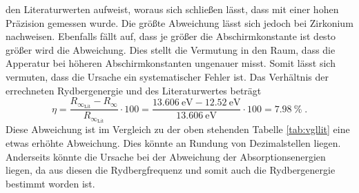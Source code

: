 den Literaturwerten aufweist, woraus sich schließen lässt, dass mit einer hohen Präzision gemessen wurde.
Die größte Abweichung lässt sich jedoch bei Zirkonium nachweisen. 
Ebenfalls fällt auf, dass je größer die Abschirmkonstante ist desto größer wird die Abweichung.
Dies stellt die Vermutung in den Raum, dass die Apperatur bei höheren Abschirmkonstanten ungenauer misst.
Somit lässt sich vermuten, dass die Ursache ein systematischer Fehler ist.
Das Verhältnis der errechneten Rydbergenergie und des Literaturwertes beträgt
\begin{equation}
    \eta = \frac{R_{\infty_\text{Lit}}-R_\infty}{R_{\infty_\text{Lit}}} \cdot 100= \frac{\SI{13.606}{\electronvolt} - \SI{12.52}{\electronvolt}}{\SI{13.606}{\electronvolt}} \cdot 100 = \SI{7.98}{\percent} \; \text{.}
\end{equation}
Diese Abweichung ist im Vergleich zu der oben stehenden Tabelle \ref{tab:vgllit} eine etwas erhöhte Abweichung.
Dies könnte an Rundung von Dezimalstellen liegen. Anderseits könnte die Ursache bei der Abweichung der Absorptionsenergien liegen, da aus diesen die Rydbergfrequenz und somit 
auch die Rydbergenergie bestimmt  worden ist.